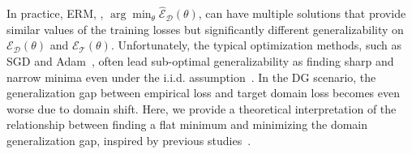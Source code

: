 In practice, ERM, \ie, $\arg\min_\theta \hat{\mathcal{E}}_{\mathcal{D}}(\theta)$, can have multiple solutions that provide similar values of the training losses but significantly different generalizability on $\mathcal{E}_{\mathcal{D}}(\theta)$ and $\mathcal{E}_{\mathcal{T}}(\theta)$.
Unfortunately, the typical optimization methods, such as SGD and Adam~\cite{kingma2015adam}, often lead sub-optimal generalizability as finding sharp and narrow minima even under the i.i.d. assumption~\cite{keskar2016largebatch,dziugaite2017computing,garipov2018fge,izmailov2018swa,jiang2019fantastic,foret2020sharpness}.
In the DG scenario, the generalization gap between empirical loss and target domain loss becomes even worse
due to domain shift.
Here, we provide a theoretical interpretation of the relationship between finding a flat minimum and minimizing the domain generalization gap, inspired by previous studies~\cite{keskar2016largebatch,dziugaite2017computing,garipov2018fge,izmailov2018swa,jiang2019fantastic,foret2020sharpness}.

